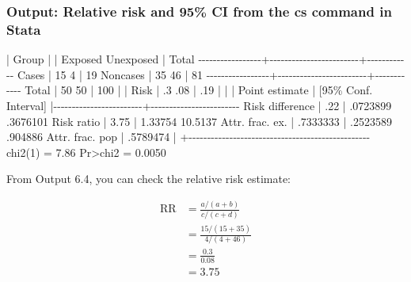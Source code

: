 \documentclass[
]{memoir}
\newenvironment{Shaded}{\begin{snugshade}}{\end{snugshade}}
\newcommand{\NormalTok}[1]{#1}
\begin{document}
\hypertarget{output-relative-risk-and-95-ci-from-the-cs-command-in-stata}{%
\subsubsection{Output: Relative risk and 95\% CI from the cs command in Stata}\label{output-relative-risk-and-95-ci-from-the-cs-command-in-stata}}

\begin{Shaded}
\begin{Highlighting}[]
\NormalTok{                 | Group                  |}
\NormalTok{                 |   Exposed   Unexposed  |      Total}
\NormalTok{{-}{-}{-}{-}{-}{-}{-}{-}{-}{-}{-}{-}{-}{-}{-}{-}{-}+{-}{-}{-}{-}{-}{-}{-}{-}{-}{-}{-}{-}{-}{-}{-}{-}{-}{-}{-}{-}{-}{-}{-}{-}+{-}{-}{-}{-}{-}{-}{-}{-}{-}{-}{-}{-}}
\NormalTok{           Cases |        15           4  |         19}
\NormalTok{        Noncases |        35          46  |         81}
\NormalTok{{-}{-}{-}{-}{-}{-}{-}{-}{-}{-}{-}{-}{-}{-}{-}{-}{-}+{-}{-}{-}{-}{-}{-}{-}{-}{-}{-}{-}{-}{-}{-}{-}{-}{-}{-}{-}{-}{-}{-}{-}{-}+{-}{-}{-}{-}{-}{-}{-}{-}{-}{-}{-}{-}}
\NormalTok{           Total |        50          50  |        100}
\NormalTok{                 |                        |}
\NormalTok{            Risk |        .3         .08  |        .19}
\NormalTok{                 |                        |}
\NormalTok{                 |      Point estimate    |    [95\% Conf. Interval]}
\NormalTok{                 |{-}{-}{-}{-}{-}{-}{-}{-}{-}{-}{-}{-}{-}{-}{-}{-}{-}{-}{-}{-}{-}{-}{-}{-}+{-}{-}{-}{-}{-}{-}{-}{-}{-}{-}{-}{-}{-}{-}{-}{-}{-}{-}{-}{-}{-}{-}{-}{-}}
\NormalTok{ Risk difference |              .22       |    .0723899    .3676101 }
\NormalTok{      Risk ratio |             3.75       |     1.33754     10.5137 }
\NormalTok{ Attr. frac. ex. |         .7333333       |    .2523589     .904886 }
\NormalTok{ Attr. frac. pop |         .5789474       |}
\NormalTok{                 +{-}{-}{-}{-}{-}{-}{-}{-}{-}{-}{-}{-}{-}{-}{-}{-}{-}{-}{-}{-}{-}{-}{-}{-}{-}{-}{-}{-}{-}{-}{-}{-}{-}{-}{-}{-}{-}{-}{-}{-}{-}{-}{-}{-}{-}{-}{-}{-}{-}}
\NormalTok{                               chi2(1) =     7.86  Pr\textgreater{}chi2 = 0.0050}
\end{Highlighting}
\end{Shaded}

From Output 6.4, you can check the relative risk estimate:

\[
\begin{aligned}
\text{RR} &= \frac{a / (a+b)}{c / (c+d)} \\
  &= \frac{15 / (15+35)}{4 / (4+46)} \\
  &= \frac{0.3}{0.08} \\
  &= 3.75
\end{aligned}
\]
\end{document}
